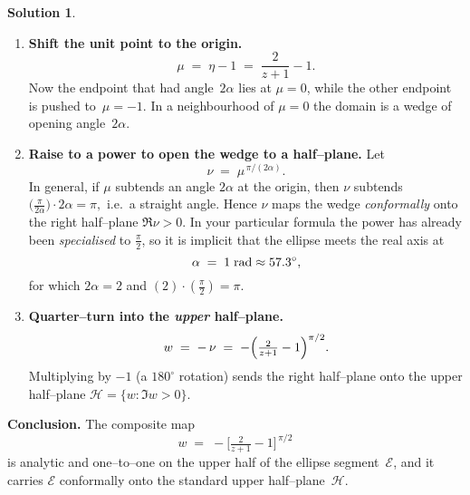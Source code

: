 \documentclass[12pt]{article}
\theoremstyle{definition} %
\newtheorem{solution}{Solution}
\theoremstyle{plain} %
\begin{document}
\begin{solution}
\begin{enumerate}[label=\textbf{Step \arabic*:}, itemsep=1.4ex]
        \item  \textbf{Shift the unit point to the origin.}  
        \[
        \mu
           \;=\;
           \eta-1
           \;=\;\frac{2}{z+1}-1.
        \]
        Now the endpoint that had angle~$2\alpha$ lies at $\mu=0$,
        while the other endpoint is pushed to~$\mu=-1$.
        In a neighbourhood of $\mu=0$
        the domain is a wedge of opening angle~$2\alpha$.
        
        \item  \textbf{Raise to a power to open the wedge to a half–plane.}  
        Let
        \[
        \nu
           \;=\;
           \mu^{\,\pi/(2\alpha)}.
        \]
        In general, if $\mu$ subtends an angle $2\alpha$ at the origin,
        then $\nu$ subtends
        \(
           \bigl(\tfrac{\pi}{2\alpha}\bigr)\!\cdot 2\alpha=\pi,
        \)
        i.e.\ a straight angle.
        Hence $\nu$ maps the wedge \emph{conformally} onto the right
        half–plane $\Re\nu>0$.
        In your particular formula the power has already been
        \emph{specialised} to $\tfrac{\pi}{2}$,
        so it is implicit that the ellipse meets the real axis at
        \[
        \alpha
           \;=\;1\;{\rm rad}\approx57.3^{\circ},
        \]
        for which $2\alpha=2$ and
        \(
           (2)\!\cdot(\tfrac{\pi}{2})=\pi.
        \)
        
        \item  \textbf{Quarter–turn into the \emph{upper} half–plane.}  
        \[
        w
           \;=\;
           -\,\nu
           \;=\;
           -\Bigl(\tfrac{2}{z+1}-1\Bigr)^{\pi/2}.
        \]
        Multiplying by $-1$ (a $180^{\circ}$ rotation) sends the right
        half–plane onto the upper half–plane
        $\mathcal H=\{w:\Im w>0\}$.
        \end{enumerate}
        
        \bigskip
        \noindent
        \textbf{Conclusion.}\;
        The composite map
        \[
        \boxed{\;
          w \;=\;
          -\bigl[\tfrac{2}{z+1}-1\bigr]^{\,\pi/2}
         \;}
        \]
        is analytic and one–to–one on the upper half of the ellipse
        segment~$\mathcal E$, and it
        carries $\mathcal E$ conformally onto the standard
        upper half–plane~$\mathcal H$.
        \end{solution}
\end{document}
